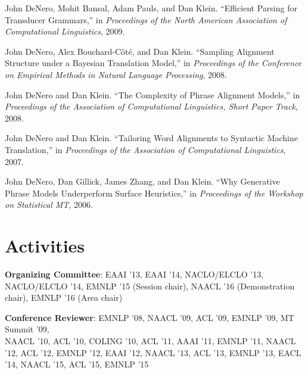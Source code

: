 \documentclass[margin,line]{res}
\begin{document}
\begin{resume}
John DeNero, Mohit Bansal, Adam Pauls, and Dan Klein. ``Efficient Parsing for Transducer Grammars,'' in {\it Proceedings of the North American Association of Computational Linguistics}, 2009.

John DeNero, Alex Bouchard-Côté, and Dan Klein. ``Sampling Alignment Structure under a Bayesian Translation Model,'' in {\it Proceedings of the Conference on Empirical Methods in Natural Language Processing}, 2008.

John DeNero and Dan Klein. ``The Complexity of Phrase Alignment Models,'' in {\it Proceedings of the Association of Computational Linguistics, Short Paper Track}, 2008.

John DeNero and Dan Klein. ``Tailoring Word Alignments to Syntactic Machine Translation,'' in {\it Proceedings of the Association of Computational Linguistics}, 2007.

John DeNero, Dan Gillick, James Zhang, and Dan Klein. ``Why Generative Phrase Models Underperform Surface Heuristics,'' in {\it Proceedings of the Workshop on Statistical MT}, 2006.

\section{\sc Activities}

{\bf Organizing Committee}: EAAI '13, EAAI '14, NACLO/ELCLO '13, NACLO/ELCLO '14,
EMNLP '15 (Session chair), NAACL '16 (Demonstration chair), EMNLP '16 (Area chair)

{\bf Conference Reviewer}: EMNLP '08, NAACL '09, ACL '09, EMNLP '09, MT Summit
'09,\\ NAACL '10, ACL '10, COLING '10, ACL '11, AAAI '11, EMNLP '11, NAACL '12,
ACL '12, EMNLP '12, EAAI '12, NAACL '13, ACL '13, EMNLP '13, EACL '14,
NAACL '15, ACL '15, EMNLP '15

\end{resume}
\end{document}
